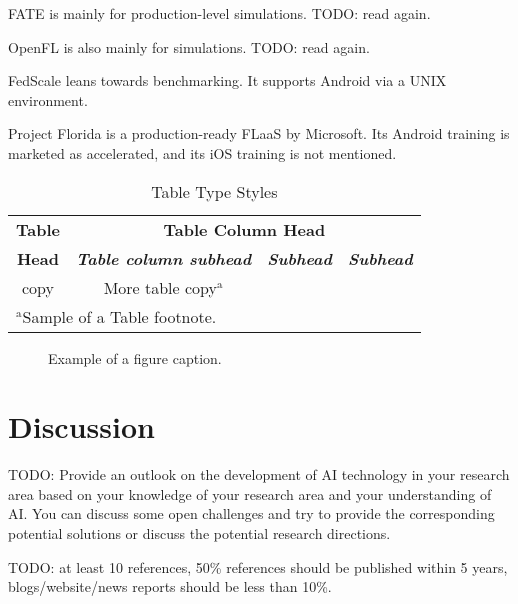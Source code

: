 \documentclass[conference]{IEEEtran}
\begin{document}
FATE \cite{liu2021fate} is mainly for production-level simulations.
TODO: read again.

OpenFL \cite{patrick2022openfl} is also mainly for simulations.
TODO: read again.

FedScale \cite{lai2022fedscale} leans towards benchmarking.
It supports Android via a UNIX environment.

Project Florida \cite{madrigal2023project}
is a production-ready FLaaS by Microsoft.
Its Android training is marketed as accelerated,
and its iOS training is not mentioned.


\begin{table}[htbp]
\caption{Table Type Styles}
\begin{center}
\begin{tabular}{|c|c|c|c|}
\hline
\textbf{Table}&\multicolumn{3}{|c|}{\textbf{Table Column Head}} \\
\cline{2-4} 
\textbf{Head} & \textbf{\textit{Table column subhead}}& \textbf{\textit{Subhead}}& \textbf{\textit{Subhead}} \\
\hline
copy& More table copy$^{\mathrm{a}}$& &  \\
\hline
\multicolumn{4}{l}{$^{\mathrm{a}}$Sample of a Table footnote.}
\end{tabular}
\label{tab1}
\end{center}
\end{table}

\begin{figure}[htbp]
\centerline{
}
\caption{Example of a figure caption.}
\label{fig}
\end{figure}

\section{Discussion}

TODO: Provide an outlook on the development of AI technology in
your research area based on your knowledge of your research area and
your understanding of AI.
You can discuss some open challenges and try to
provide the corresponding potential solutions or
discuss the potential research directions.

\printbibliography

TODO: at least 10 references,
50\% references should be published within 5 years,
blogs/website/news reports should be less than 10\%.
\end{document}
